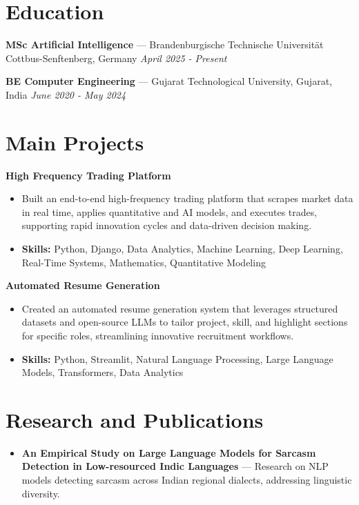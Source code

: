 \documentclass[a4paper,10pt]{article}
\begin{document}
\section*{Education}
\textbf{MSc Artificial Intelligence} — Brandenburgische Technische Universität Cottbus-Senftenberg, Germany \hfill \textit{April 2025 - Present}\par
\vspace{1.5pt}
\textbf{BE Computer Engineering} — Gujarat Technological University, Gujarat, India \hfill \textit{June 2020 - May 2024}\par

\section*{Main Projects}
\textbf{High Frequency Trading Platform}\par
\vspace{1pt}
\begin{itemize}
  \item Built an end-to-end high-frequency trading platform that scrapes market data in real time, applies quantitative and AI models, and executes trades, supporting rapid innovation cycles and data-driven decision making.
  \item \textbf{Skills:} Python, Django, Data Analytics, Machine Learning, Deep Learning, Real-Time Systems, Mathematics, Quantitative Modeling
\end{itemize}
\vspace{3pt}
\textbf{Automated Resume Generation}\par
\vspace{1pt}
\begin{itemize}
  \item Created an automated resume generation system that leverages structured datasets and open-source LLMs to tailor project, skill, and highlight sections for specific roles, streamlining innovative recruitment workflows.
  \item \textbf{Skills:} Python, Streamlit, Natural Language Processing, Large Language Models, Transformers, Data Analytics
\end{itemize}

\section*{Research and Publications}
\begin{itemize}
\item \textbf{An Empirical Study on Large Language Models for Sarcasm Detection in Low-resourced Indic Languages} — Research on NLP models detecting sarcasm across Indian regional dialects, addressing linguistic diversity.
\end{itemize}
\end{document}
